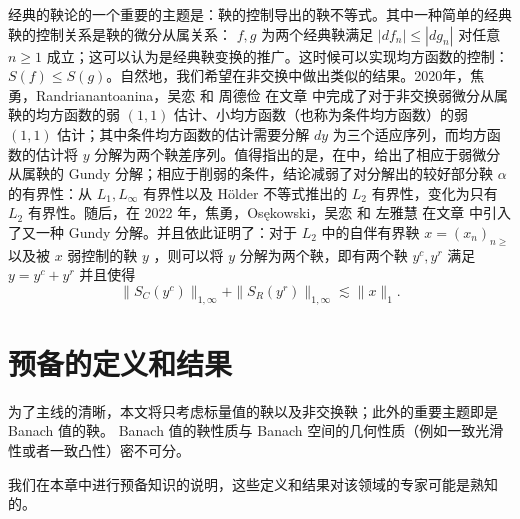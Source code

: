 \par 经典的鞅论的一个重要的主题是：鞅的控制导出的鞅不等式。其中一种简单的经典鞅的控制关系是鞅的微分从属关系： $f,g$ 为两个经典鞅满足 $|df_n|\leq|dg_n|$ 对任意 $n\geq1$ 成立；这可以认为是经典鞅变换的推广。这时候可以实现均方函数的控制：$S(f)\leq S(g)$。自然地，我们希望在非交换中做出类似的结果。2020年，焦勇，Randrianantoanina，吴恋 和 周德俭 在文章\cite{MR4072235-CSU-Square;differentially-subordinate} 中完成了对于非交换弱微分从属鞅的均方函数的弱 $(1,1)$ 估计、小均方函数（也称为条件均方函数）的弱 $(1,1)$ 估计；其中条件均方函数的估计需要分解 $dy$ 为三个适应序列，而均方函数的估计将 $y$ 分解为两个鞅差序列。值得指出的是，在\cite[Theorem~3.1]{MR4072235-CSU-Square;differentially-subordinate}中，给出了相应于弱微分从属鞅的 Gundy 分解；相应于削弱的条件，结论减弱了对分解出的较好部分鞅 $\alpha$ 的有界性：从 $L_1,L_\infty$ 有界性以及 H\"{o}lder 不等式推出的 $L_2$ 有界性，变化为只有 $L_2$ 有界性。随后，在 2022 年，焦勇，Os\k{e}kowski，吴恋 和 左雅慧 在文章\cite{MR4504935-CSU-weakly-dominated-martingales} 中引入了又一种 Gundy 分解。并且依此证明了：对于 $L_2$ 中的自伴有界鞅 $x=(x_n)_{n\geq}$ 以及被 $x$ 弱控制的鞅 $y$ ，则可以将 $y$ 分解为两个鞅，即有两个鞅 $y^c,y^r$ 满足 $y=y^c+y^r$ 并且使得
    \[\|{S_C(y^c)}\|_{1,\infty}+\|{S_R(y^r)}\|_{1,\infty}\lesssim\|x\|_1.\]
\chapter{预备的定义和结果}


\newcommand{\N}{\mathbb{N}}
\newcommand{\Z}{\mathbb{Z}}
\newcommand{\R}{\mathbb{R}}
\newcommand{\C}{\mathbb{C}}


\let\cal\mathcal
\allowdisplaybreaks

\newcommand{\dem}{\noindent {\sl 证明： }}
\newcommand{\fin}{\hspace*{\fill} $\square$ \vskip0.2cm}


为了主线的清晰，本文将只考虑标量值的鞅以及非交换鞅；此外的重要主题即是 Banach 值的鞅。 Banach 值的鞅性质与 Banach 空间的几何性质（例如一致光滑性或者一致凸性）密不可分。
\par 我们在本章中进行预备知识的说明，这些定义和结果对该领域的专家可能是熟知的。


